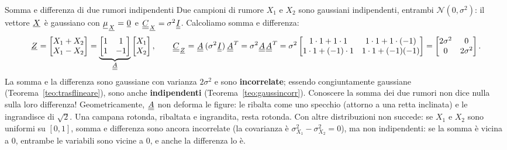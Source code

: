 \begin{esempio}{Somma e differenza di due rumori indipendenti}
Due campioni di rumore $X_1$ e $X_2$ sono gaussiani indipendenti, entrambi $\mathcal{N}(0, \sigma^2)$: il vettore
${\mkern1mu\underline{X}\mkern1mu}$ è gaussiano con ${\mkern1mu\underline{\mu}\mkern1mu}_{{\mkern1mu\underline{X}\mkern1mu}} = {\mkern1mu\underline{0}\mkern1mu}$ e ${\mkern1mu\underline{\underline{C}}\mkern1mu}_{{\mkern1mu\underline{X}\mkern1mu}} = \sigma^2 {\mkern1mu\underline{\underline{I}}\mkern1mu}$. Calcoliamo
somma e differenza:
\[ {\mkern1mu\underline{Z}\mkern1mu} = \begin{bmatrix} X_1 + X_2 \\ X_1 - X_2 \end{bmatrix} = \underbrace{\begin{bmatrix} 1 & 1 \\ 1 & -1
   \end{bmatrix}}_{{\mkern1mu\underline{\underline{A}}\mkern1mu}} \begin{bmatrix} X_1 \\ X_2 \end{bmatrix} , \qquad
   {\mkern1mu\underline{\underline{C}}\mkern1mu}_{{\mkern1mu\underline{Z}\mkern1mu}} = {\mkern1mu\underline{\underline{A}}\mkern1mu}\, (\sigma^2 {\mkern1mu\underline{\underline{I}}\mkern1mu})\, {\mkern1mu\underline{\underline{A}}\mkern1mu}^T = \sigma^2 {\mkern1mu\underline{\underline{A}}\mkern1mu}{\mkern1mu\underline{\underline{A}}\mkern1mu}^T = \sigma^2
   \begin{bmatrix} 1 \cdot 1 + 1 \cdot 1 & 1 \cdot 1 + 1 \cdot (-1) \\ 1 \cdot 1 + (-1) \cdot 1 & 1 \cdot 1 + (-1)(-1)
   \end{bmatrix} = \begin{bmatrix} 2\sigma^2 & 0 \\ 0 & 2\sigma^2 \end{bmatrix} . \]
La somma e la differenza sono gaussiane con varianza $2\sigma^2$ e sono \textbf{incorrelate}; essendo congiuntamente
gaussiane (Teorema~\ref{teo:trasflineare}), sono anche \textbf{indipendenti} (Teorema~\ref{teo:gaussincorr}). Conoscere
la somma dei due rumori non dice nulla sulla loro differenza! Geometricamente, ${\mkern1mu\underline{\underline{A}}\mkern1mu}$ non deforma le figure: le
ribalta come uno specchio (attorno a una retta inclinata) e le ingrandisce di $\sqrt{2}$. Una campana rotonda,
ribaltata e ingrandita, resta rotonda. Con altre distribuzioni non succede: se $X_1$ e $X_2$
sono uniformi su $[0, 1]$, somma e differenza sono ancora incorrelate (la covarianza è $\sigma_{X_1}^2 - \sigma_{X_2}^2
= 0$), ma non indipendenti: se la somma è vicina a 0, entrambe le variabili sono vicine a 0, e anche la differenza lo è.
\end{esempio}

